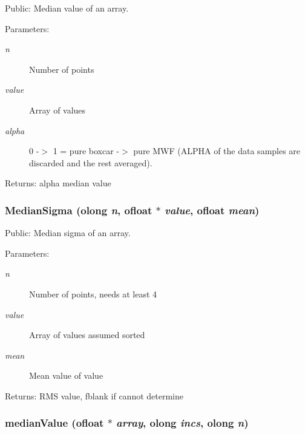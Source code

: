 Public: Median value of an array. 

\begin{Desc}
\item[Parameters:]
\begin{description}
\item[{\em n}]Number of points \item[{\em value}]Array of values \item[{\em alpha}]0 -$>$ 1 = pure boxcar -$>$ pure MWF (ALPHA of the data samples are discarded and the rest averaged). \end{description}
\end{Desc}
\begin{Desc}
\item[Returns:]alpha median value \end{Desc}
\subsubsection{ Median\-Sigma ({\bf olong} {\em n}, {\bf ofloat} $\ast$ {\em value}, {\bf ofloat} {\em mean})}\label{ObitUtil_8h_a5}


Public: Median sigma of an array. 

\begin{Desc}
\item[Parameters:]
\begin{description}
\item[{\em n}]Number of points, needs at least 4 \item[{\em value}]Array of values assumed sorted \item[{\em mean}]Mean value of value \end{description}
\end{Desc}
\begin{Desc}
\item[Returns:]RMS value, fblank if cannot determine \end{Desc}
\subsubsection{ median\-Value ({\bf ofloat} $\ast$ {\em array}, {\bf olong} {\em incs}, {\bf olong} {\em n})}\label{ObitUtil_8h_a1}


